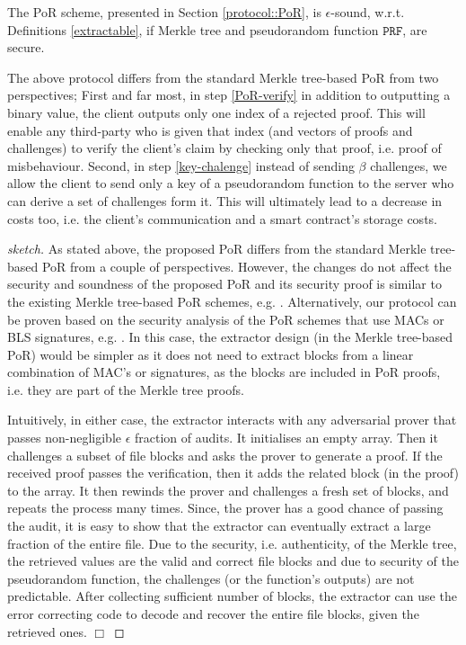 


\begin{theorem}
The PoR scheme, presented in Section \ref{protocol::PoR}, is $\epsilon$-sound, w.r.t. Definitions \ref{extractable}, if Merkle tree and pseudorandom function $\mathtt{PRF}$, are secure. 

\end{theorem}


 The above protocol differs from the standard Merkle tree-based PoR from two perspectives; First and far most,  in step \ref{PoR-verify} in addition to outputting a binary value, the client outputs only one index of a rejected proof. This will enable any third-party who is given that index (and vectors of proofs and challenges) to verify the client's claim by checking only that proof, i.e. proof of misbehaviour. Second,   in step \ref{key-chalenge} instead of sending $\beta$ challenges, we allow the client to send only a key of a pseudorandom function to the server who can derive a set of challenges form it. This will ultimately  lead to a decrease in costs too, i.e. the client's communication and a smart contract's storage costs.   
 
 \begin{proof}[sketch]
 As stated above, the proposed PoR differs from the standard Merkle tree-based PoR from a couple of perspectives. However, the changes do not affect the security and soundness of the proposed PoR and its security proof is similar to the existing Merkle tree-based PoR schemes, e.g. \cite{DBLP:conf/ccs/HaleviHPS11,MillerPermacoin,DBLP:journals/iacr/JuelsK07}. Alternatively, our protocol can be proven based on the security analysis of the PoR schemes that use  MACs or BLS signatures, e.g. \cite{DBLP:conf/asiacrypt/ShachamW08}. In this case, the extractor design (in the Merkle tree-based PoR)  would be simpler as it does not need to extract blocks from a linear combination of MAC's or signatures, as the  blocks are included in PoR proofs, i.e. they are part of the Merkle tree proofs. 
 
 Intuitively, in either case, the extractor interacts with any adversarial prover that passes non-negligible $\epsilon$ fraction of audits. It initialises an empty array. Then it  challenges a subset of file blocks and asks the prover to generate a proof.  If the received proof passes the verification, then it adds the related block (in the proof) to the array. It then rewinds the prover and challenges a fresh set of blocks, and repeats the process  many times. Since, the prover has a good chance of passing the audit, it is easy to show that the extractor can eventually extract a large fraction of the entire file. Due to the security, i.e. authenticity, of the Merkle tree, the retrieved values are the valid and correct file blocks and due to security of the pseudorandom function, the challenges (or the function's outputs) are not predictable. After collecting sufficient number of blocks, the extractor can use the error correcting code to decode and recover the entire file blocks, given the retrieved ones. 
 \hfill\(\Box\)\end{proof}
   
